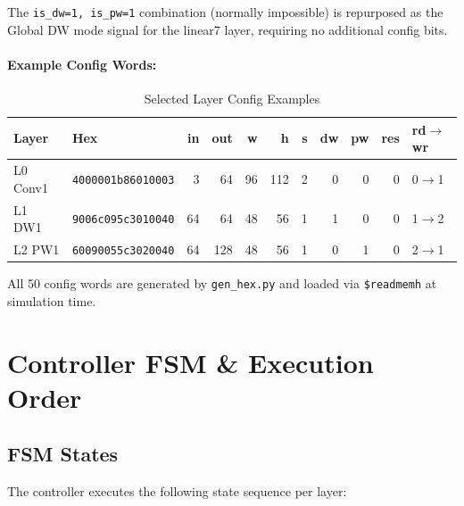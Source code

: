 The \texttt{is\_dw=1, is\_pw=1} combination (normally impossible) is repurposed as the Global DW mode signal for the linear7 layer, requiring no additional config bits.
 
\paragraph{Example Config Words:}
 
\begin{table}[H]
\centering
\caption{Selected Layer Config Examples}
\begin{tabular}{llrrrrrrrrl}
\toprule
\textbf{Layer} & \textbf{Hex} & \textbf{in} & \textbf{out} & \textbf{w} & \textbf{h} & \textbf{s} & \textbf{dw} & \textbf{pw} & \textbf{res} & \textbf{rd$\to$wr} \\
\midrule
L0 Conv1  & \texttt{4000001b86010003} & 3   & 64  & 96 & 112 & 2 & 0 & 0 & 0 & 0$\to$1 \\
L1 DW1    & \texttt{9006c095c3010040} & 64  & 64  & 48 & 56  & 1 & 1 & 0 & 0 & 1$\to$2 \\
L2 PW1    & \texttt{60090055c3020040} & 64  & 128 & 48 & 56  & 1 & 0 & 1 & 0 & 2$\to$1 \\
\bottomrule
\end{tabular}
\end{table}
 
All 50 config words are generated by \texttt{gen\_hex.py} and loaded via \texttt{\$readmemh} at simulation time.
 
\section{Controller FSM \& Execution Order}
 
\subsection{FSM States}
 
The controller executes the following state sequence per layer:
 
